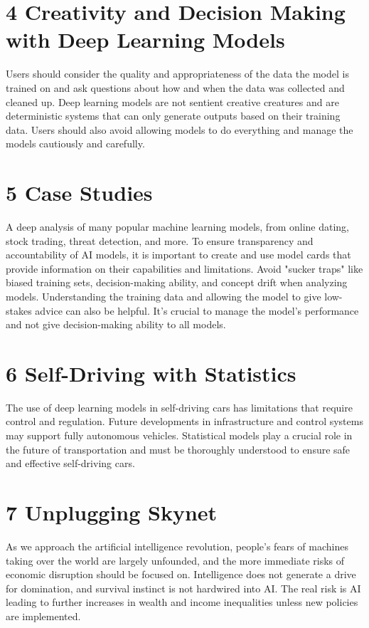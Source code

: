 \section*{4 Creativity and Decision Making with Deep Learning Models}

Users should consider the quality and appropriateness of the data the model is trained on and ask questions about how and when the data was collected and cleaned up. Deep learning models are not sentient creative creatures and are deterministic systems that can only generate outputs based on their training data. Users should also avoid allowing models to do everything and manage the models cautiously and carefully.

\section*{5 Case Studies}

A deep analysis of many popular machine learning models, from online dating, stock trading, threat detection, and more. To ensure transparency and accountability of AI models, it is important to create and use model cards that provide information on their capabilities and limitations. Avoid "sucker traps" like biased training sets, decision-making ability, and concept drift when analyzing models. Understanding the training data and allowing the model to give low-stakes advice can also be helpful. It’s crucial to manage the model’s performance and not give decision-making ability to all models.

\section*{6 Self-Driving with Statistics}

The use of deep learning models in self-driving cars has limitations that require control and regulation. Future developments in infrastructure and control systems may support fully autonomous vehicles. Statistical models play a crucial role in the future of transportation and must be thoroughly understood to ensure safe and effective self-driving cars.

\section*{7 Unplugging Skynet}

As we approach the artificial intelligence revolution, people’s fears of machines taking over the world are largely unfounded, and the more immediate risks of economic disruption should be focused on. Intelligence does not generate a drive for domination, and survival instinct is not hardwired into AI. The real risk is AI leading to further increases in wealth and income inequalities unless new policies are implemented.

